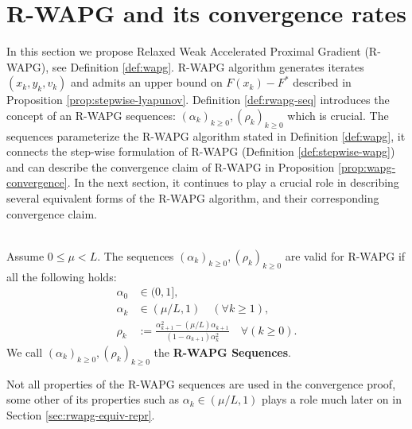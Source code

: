 \documentclass[12pt]{article}
\begin{document}
\section{R-WAPG and its convergence rates}\label{sec:rwapg-formulation-convergence}
    In this section we propose Relaxed Weak Accelerated Proximal Gradient (R-WAPG), see Definition \ref{def:wapg}.
    R-WAPG algorithm generates iterates $(x_k, y_k, v_k)$ and admits an upper bound on $F(x_k) - F^*$ described in Proposition \ref{prop:stepwise-lyapunov}.
    Definition \ref{def:rwapg-seq} introduces the concept of an R-WAPG sequences: $(\alpha_k)_{k \ge 0}, (\rho_k)_{k \ge 0}$ which is crucial.
    The sequences parameterize the R-WAPG algorithm stated in Definition \ref{def:wapg}, it connects the step-wise formulation of R-WAPG (Definition \ref{def:stepwise-wapg}) and can describe the convergence claim of R-WAPG in Proposition \ref{prop:wapg-convergence}.
    In the next section, it continues to play a crucial role in describing several equivalent forms of the R-WAPG algorithm, and their corresponding convergence claim.
    \begin{definition}\label{def:rwapg-seq}\;\\
        Assume $0 \le \mu < L$.
        The sequences $(\alpha_k)_{k \ge 0}, (\rho_k)_{k \ge 0}$ are valid for R-WAPG if all the following holds:
        \begin{align*}
            \alpha_0 &\in (0, 1],
            \\
            \alpha_k &\in (\mu/L, 1) \quad (\forall k \ge 1),
            \\
            \rho_k &:= \frac{\alpha_{k + 1}^2 - (\mu/L)\alpha_{k + 1}}{(1 - \alpha_{k + 1})\alpha_k^2} \quad \forall (k \ge 0).
        \end{align*}
        We call $(\alpha_k)_{k \ge 0}, (\rho_k)_{k \ge 0}$ the \textbf{R-WAPG Sequences}.
    \end{definition}
    Not all properties of the R-WAPG sequences are used in the convergence proof, some other of its properties such as $\alpha_k \in (\mu/L, 1)$ plays a role much later on in Section \ref{sec:rwapg-equiv-repr}.
\end{document}
